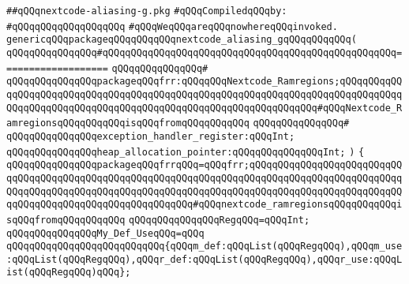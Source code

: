 \label{src/lib/compiler/back/low/main/nextcode/nextcode-aliasing-g.pkg}
\verb|##qQQqnextcode-aliasing-g.pkg|\newline
\newline
\verb|#qQQqCompiledqQQqby:|\newline
\verb|#qQQqqQQqqQQqqQQqqQQq|\newline
\newline
\verb|#qQQqWeqQQqareqQQqnowhereqQQqinvoked.|\newline
\newline
\verb|genericqQQqpackageqQQqqQQqqQQqnextcode_aliasing_gqQQqqQQqqQQq(|\newline
\verb|qQQqqQQqqQQqqQQq#qQQqqQQqqQQqqQQqqQQqqQQqqQQqqQQqqQQqqQQqqQQqqQQqqQQq===================|\newline
\verb|qQQqqQQqqQQqqQQq#|\newline
\verb|qQQqqQQqqQQqqQQqpackageqQQqfrr:qQQqqQQqNextcode_Ramregions;qQQqqQQqqQQqqQQqqQQqqQQqqQQqqQQqqQQqqQQqqQQqqQQqqQQqqQQqqQQqqQQqqQQqqQQqqQQqqQQqqQQqqQQqqQQqqQQqqQQqqQQqqQQqqQQqqQQqqQQqqQQqqQQqqQQqqQQq#qQQqNextcode_RamregionsqQQqqQQqqQQqisqQQqfromqQQqqQQqqQQq|\newline
\verb|qQQqqQQqqQQqqQQq#|\newline
\verb|qQQqqQQqqQQqqQQqexception_handler_register:qQQqInt;|\newline
\verb|qQQqqQQqqQQqqQQqheap_allocation_pointer:qQQqqQQqqQQqqQQqInt;|\newline
\verb|)|\newline
\verb|{|\newline
\verb|qQQqqQQqqQQqqQQqpackageqQQqfrrqQQq=qQQqfrr;qQQqqQQqqQQqqQQqqQQqqQQqqQQqqQQqqQQqqQQqqQQqqQQqqQQqqQQqqQQqqQQqqQQqqQQqqQQqqQQqqQQqqQQqqQQqqQQqqQQqqQQqqQQqqQQqqQQqqQQqqQQqqQQqqQQqqQQqqQQqqQQqqQQqqQQqqQQqqQQqqQQqqQQqqQQqqQQqqQQqqQQqqQQqqQQqqQQqqQQq#qQQqnextcode_ramregionsqQQqqQQqqQQqisqQQqfromqQQqqQQqqQQq|\newline
\newline
\verb|qQQqqQQqqQQqqQQqRegqQQq=qQQqInt;|\newline
\verb|qQQqqQQqqQQqqQQqMy_Def_UseqQQq=qQQq|\newline
\verb|qQQqqQQqqQQqqQQqqQQqqQQqqQQq{qQQqm_def:qQQqList(qQQqRegqQQq),qQQqm_use:qQQqList(qQQqRegqQQq),qQQqr_def:qQQqList(qQQqRegqQQq),qQQqr_use:qQQqList(qQQqRegqQQq)qQQq};|\newline
